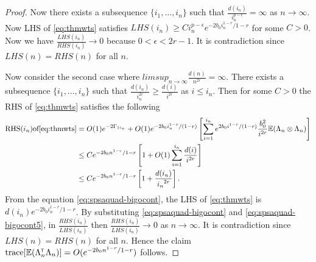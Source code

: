 \begin{proof}
Now there exists a subsequence $\{i_1,\ldots,i_n\}$ such that $ \frac{d(i_n)}{i_n^{p-\epsilon}} = \infty$ as $n \to \infty$. Now LHS of \eqref{eq:thmwts} satisfies $LHS(i_n) \ge C i_n^{p-\epsilon} e^{-2b_0 i_n^{1-r} / {1-r}}$ for some $C > 0$. Now we have $\frac{LHS(i_n)}{RHS(i_n)} \to 0$ because  $0 < \epsilon < 2r -1$. It is contradiction since $LHS(n) = RHS(n)$ for all $n$.

Now consider the second case where $lim sup_{n \to \infty} \frac{d(n)}{n^{2r}} = \infty$. There exists a subsequence $\{i_1,\ldots,i_n\}$ such that $ \frac{d(i_n)}{i_n^{2r}} \ge \frac{d(i)}{i^{2r}}$ as $i \le i_n$. Then for some $C >0$ the RHS of \eqref{eq:thmwts} satisfies the following 
\begin{align}
\text{RHS}(i_n)  \text{of}  \eqref{eq:thmwts} &= O(1) e^{-2 \Gamma_{1i_n}} +  O(1) e^{-2 b_0 i_n^{1-r}/(1-r)} \left[\sum_{i=1}^{i_n} e^{2 b_0 i^{1-r}/(1-r)} \frac{b_0^2}{i^{2r}} \mathbb{E} (\Lambda_{n} \otimes \Lambda_{n}) \right]\nonumber \\
&\le C e^{-2b_0n^{1-r} / {1-r}} \left[ 1 + O(1) \sum_{i =1}^{i_n} \frac{d(i)}{i^{2r}}\right]\nonumber \\
&\le C e^{-2b_0n^{1-r} / {1-r}} \left[ 1 + \frac{d(i_n)}{{i_n}^{2r}}\right].
\label{eq:spsaquad-bigocont5}
\end{align}
From the equation \eqref{eq:spsaquad-bigocont}, the  LHS of \eqref{eq:thmwts} is $d(i_n) e^{-2b_0 i_n^{1-r} / {1-r}}$. By substituting \eqref{eq:spsaquad-bigocont} and \eqref{eq:spsaquad-bigocont5}, in $\frac{RHS(i_n)}{LHS(i_n)}$ then $\frac{RHS(i_n)}{LHS(i_n)} \to 0$ as $n \to \infty$. It is contradiction since $LHS(n) = RHS(n)$ for all $n$. Hence the claim $\text{trace}[\mathbb{E} (\Lambda_n ^\mathsf{\scriptscriptstyle T} \Lambda_n)] = O(e^{-2b_0n^{1-r} / {1-r}})$ follows.
\end{proof}



